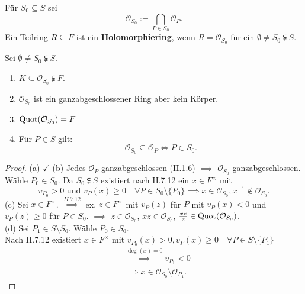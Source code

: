 \begin{definition}
    Für $S_0 \subseteq S$ sei $$\mathcal{O}_{S_0} := \bigcap_{P \in S_0} \mathcal{O}_P.$$ 
    Ein Teilring $R \subseteq F$ ist ein \textbf{Holomorphiering}, wenn $R = \mathcal{O}_{S_0}$ für ein $\emptyset \ne S_0 \subsetneqq S$.
\end{definition}

\begin{lemma}
    Sei $\emptyset \ne S_0 \subsetneqq S$.
    \begin{enumerate}[label=(\alph*)]
        \item $K \subseteq \mathcal{O}_{S_0} \subsetneqq F$.
        \item $\mathcal{O}_{S_0}$ ist ein ganzabgeschlossener Ring aber kein Körper.
        \item $\operatorname{Quot}(\mathcal{O}_{S_0}) = F$
        \item Für $P \in S$ gilt:
        $$ \mathcal{O}_{S_0} \subseteq \mathcal{O}_P \iff P \in S_0.$$
    \end{enumerate} 
\end{lemma}
\begin{proof}
    (a) $\checkmark$ (b) Jedes $\mathcal{O}_P$ ganzabgeschlossen (II.1.6) $\implies$ $\mathcal{O}_{S_0}$ ganzabgeschlossen.
    Wähle $P_0 \in S_0$. Da $S_0 \subsetneqq S$ existiert nach II.7.12 ein $x \in F^\times$ mit
    $$ v_{P_0} > 0 \text{ und } v_P(x) \geq 0 \quad \forall P \in S_0 \setminus \{P_0\} \implies x \in \mathcal{O}_{S_0}, x^{-1} \notin \mathcal{O}_{S_0}.$$
    (c) Sei $x \in F^\times$. $\stackrel{II.7.12}{\implies}$ ex. $z \in F^\times$ mit $v_P(z)$ für $P$ mit $v_P(x) < 0$
    und $v_P(z) \geq 0$ für $P \in S_0$. $\implies$ $z \in \mathcal{O}_{S_0}$, $xz \in \mathcal{O}_{S_0}$, $\frac{xz}{z} \in \operatorname{Quot}(\mathcal{O}_{S_0})$.\\
    (d) Sei $P_1 \in S \setminus S_0$. Wähle $P_0 \in S_0$.\\
    Nach II.7.12 existiert $x \in F^\times$ mit $v_{P_0}(x) > 0, v_P(x) \geq 0 \quad \forall P \in S \setminus\{P_1\}$
    \begin{align*}
        & \stackrel{\deg (x) = 0}{\implies} v_{P_1} < 0\\
        & \implies x \in \mathcal{O}_{S_0} \setminus \mathcal{O}_{P_1}.
    \end{align*}
\end{proof}

